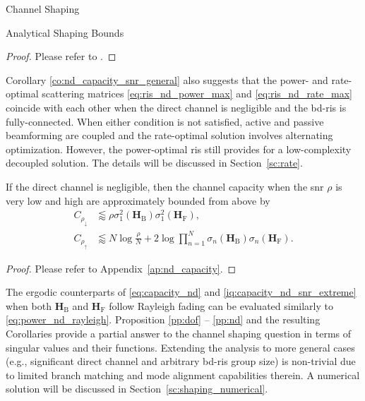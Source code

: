 \documentclass[journal]{IEEEtran}
\begin{document}
\begin{section}{Channel Shaping}
\begin{subsection}{Analytical Shaping Bounds}
		\begin{proof}
			Please refer to \cite[Appendix~A]{Bartoli2023}.
		\end{proof}

		Corollary \ref{co:nd_capacity_snr_general} also suggests that the power- and rate-optimal scattering matrices \eqref{eq:ris_nd_power_max} and \eqref{eq:ris_nd_rate_max} coincide with each other when the direct channel is negligible and the \gls{bd}-\gls{ris} is fully-connected.
		When either condition is not satisfied, active and passive beamforming are coupled and the rate-optimal solution involves alternating optimization.
		However, the power-optimal \gls{ris} still provides for a low-complexity decoupled solution.
		The details will be discussed in Section~\ref{sc:rate}.

		\begin{corollary}
			\label{co:nd_capacity_snr_extreme}
			If the direct channel is negligible, then the channel capacity when the \gls{snr} $\rho$ is very low and high are approximately bounded from above by
			\begin{subequations}
				\label{iq:capacity_nd_snr_extreme}
				\begin{align}
					C_{\rho_\downarrow} & \lessapprox \rho \sigma_1^2(\mathbf{H}_\mathrm{B}) \sigma_1^2(\mathbf{H}_\mathrm{F}), \label{iq:capacity_nd_snr_low}                                           \\
					C_{\rho_\uparrow}   & \lessapprox N \log \frac{\rho}{N} + 2 \log \prod_{n=1}^N \sigma_n(\mathbf{H}_\mathrm{B}) \sigma_n(\mathbf{H}_\mathrm{F}). \label{iq:capacity_nd_snr_high}
				\end{align}
			\end{subequations}
		\end{corollary}

		\begin{proof}
			Please refer to Appendix~\ref{ap:nd_capacity}.
		\end{proof}

		The ergodic counterparts of \eqref{eq:capacity_nd} and \eqref{iq:capacity_nd_snr_extreme} when both $\mathbf{H}_\mathrm{B}$ and $\mathbf{H}_\mathrm{F}$ follow Rayleigh fading can be evaluated similarly to \eqref{eq:power_nd_rayleigh}.
		Proposition \ref{pp:dof} -- \ref{pp:nd} and the resulting Corollaries provide a partial answer to the channel shaping question in terms of singular values and their functions.
		Extending the analysis to more general cases (e.g., significant direct channel and arbitrary \gls{bd}-\gls{ris} group size) is non-trivial due to limited branch matching and mode alignment capabilities therein.
		A numerical solution will be discussed in Section~\ref{sc:shaping_numerical}.
	\end{subsection}


\end{section}
\end{document}

